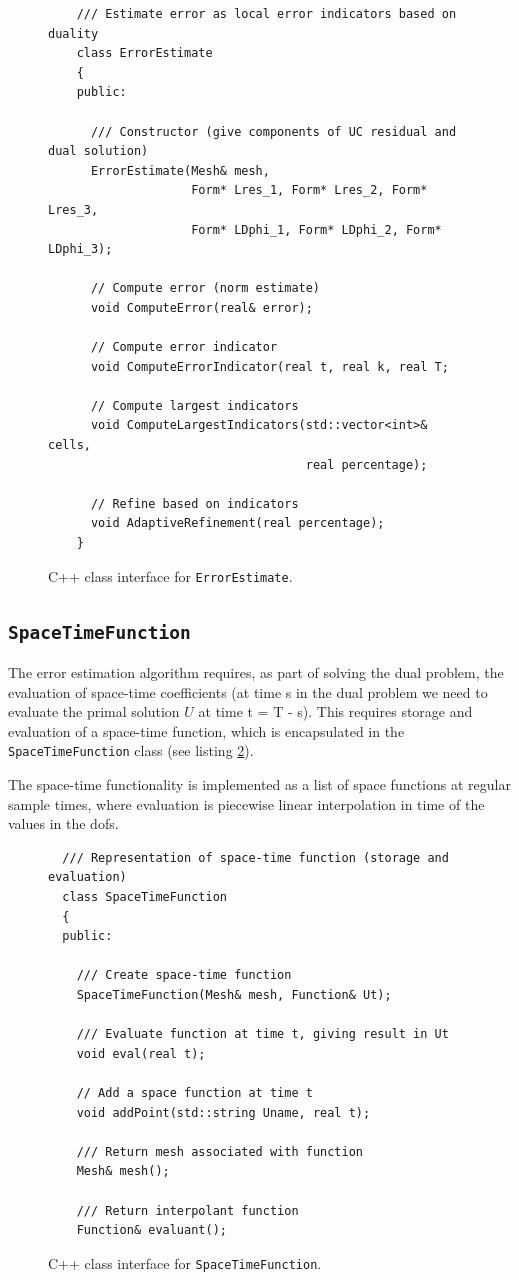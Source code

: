 \begin{figure}[!h]
{\small
\begin{lstlisting}
    /// Estimate error as local error indicators based on duality
    class ErrorEstimate
    {
    public:
      
      /// Constructor (give components of UC residual and dual solution)
      ErrorEstimate(Mesh& mesh,
                    Form* Lres_1, Form* Lres_2, Form* Lres_3,
                    Form* LDphi_1, Form* LDphi_2, Form* LDphi_3);
      
      // Compute error (norm estimate)
      void ComputeError(real& error);
      
      // Compute error indicator
      void ComputeErrorIndicator(real t, real k, real T;
      
      // Compute largest indicators
      void ComputeLargestIndicators(std::vector<int>& cells,
                                    real percentage);
      
      // Refine based on indicators
      void AdaptiveRefinement(real percentage);
    }
\end{lstlisting}
}
\caption{
C++ class interface for {\tt ErrorEstimate}.
}
\label{code:ErrorEstimate}
\end{figure}

\subsection{\tt SpaceTimeFunction}

The error estimation algorithm requires, as part of solving the dual
problem, the evaluation of space-time coefficients (at time s in the
dual problem we need to evaluate the primal solution $U$ at time t = T
- s). This requires storage and evaluation of a space-time function,
which is encapsulated in the {\tt SpaceTimeFunction} class (see
listing \ref{code:SpaceTimeFunction}).

The space-time functionality is implemented as a list of space
functions at regular sample times, where evaluation is piecewise
linear interpolation in time of the values in the dofs.


\begin{figure}[!h]
{\small
\begin{lstlisting}
  /// Representation of space-time function (storage and evaluation)
  class SpaceTimeFunction
  {
  public:

    /// Create space-time function
    SpaceTimeFunction(Mesh& mesh, Function& Ut);

    /// Evaluate function at time t, giving result in Ut
    void eval(real t);

    // Add a space function at time t
    void addPoint(std::string Uname, real t);

    /// Return mesh associated with function
    Mesh& mesh();

    /// Return interpolant function
    Function& evaluant();
\end{lstlisting}
}
\caption{
C++ class interface for {\tt SpaceTimeFunction}.
}
\label{code:SpaceTimeFunction}
\end{figure}



